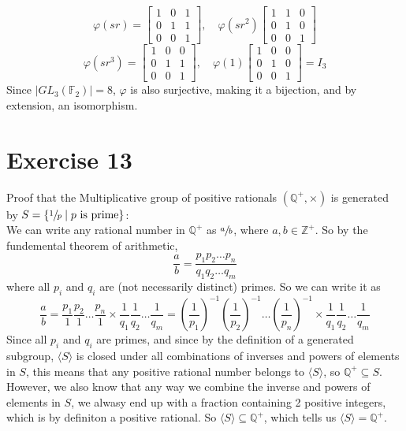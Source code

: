 \documentclass[12pt]{article}
\newcommand{\Z}{\mathbb{Z}}
\newcommand{\Q}{\mathbb{Q}}
\newcommand{\F}{\mathbb{F}}
\newcommand{\sub}{\subseteq}
\begin{document}
    \[ \varphi(sr) = \begin{bmatrix} 1 & 0 & 1 \\
        0 & 1 & 1 \\
        0 & 0 & 1 \end{bmatrix}, \quad
    \varphi(sr^2) \begin{bmatrix} 1 & 1 & 0 \\
        0 & 1 & 0 \\
        0 & 0 & 1 \end{bmatrix} \]
    \[ \varphi(sr^3) = \begin{bmatrix} 1 & 0 & 0 \\
        0 & 1 & 1 \\
        0 & 0 & 1 \end{bmatrix}, \quad
    \varphi(1) \begin{bmatrix} 1 & 0 & 0 \\
        0 & 1 & 0 \\
        0 & 0 & 1 \end{bmatrix} = I_3 \]
    Since $|GL_3(\F_2)| = 8$, $\varphi$ is also surjective,
    making it a bijection,
    and by extension, an isomorphism.


    \section*{Exercise 13}
    Proof that the Multiplicative group of positive rationals
    $(\Q^+, \times)$ is generated
    by $S = \{\sfrac{1}{p} \mid p \text{ is prime}\}$: \\
    We can write any rational number in $\Q^+$ as $\sfrac{a}{b}$,
    where $a, b \in \Z^+$.
    So by the fundemental theorem of arithmetic,
    \[ \dfrac{a}{b} = \dfrac{p_1p_2 \dots p_n}{q_1q_2 \dots q_m} \]
    where all $p_i$ and $q_i$ are (not necessarily distinct) primes.
    So we can write it as
    \[ \dfrac{a}{b}
    = \dfrac{p_1}{1}\dfrac{p_2}{1} \dots \dfrac{p_n}{1} \times
    \dfrac{1}{q_1}\dfrac{1}{q_2} \dots \dfrac{1}{q_m}
    = \left(\dfrac{1}{p_1}\right)^{-1} \left(\dfrac{1}{p_2}\right)^{-1}
    \dots \left(\dfrac{1}{p_n}\right)^{-1}
    \times \dfrac{1}{q_1}\dfrac{1}{q_2} \dots \dfrac{1}{q_m} \]
    Since all $p_i$ and $q_i$ are primes,
    and since by the definition of a generated subgroup,
    $\langle S \rangle$ is closed under all combinations of
    inverses and powers of elements in $S$,
    this means that any positive rational number belongs
    to $\langle S \rangle$,
    so $\Q^+ \sub S$. \\
    However, we also know that any way we combine
    the inverse and powers of elements in $S$,
    we alwasy end up with a fraction containing 2 positive integers,
    which is by definiton a positive rational.
    So $\langle S \rangle \sub \Q^+$,
    which tells us $\langle S \rangle = \Q^+$.
\end{document}
